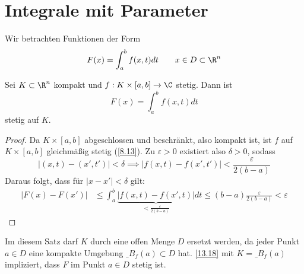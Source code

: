 \documentclass{mycourse}
\begin{document}
\section{Integrale mit Parameter}

Wir betrachten Funktionen der Form
\[
F(x) = \int_a^bf(x,t)dt \qquad x\in D\subset \R^n
\]

\begin{st}
\label{13.18}
Sei $K\subset \R^n$ kompakt und $f:K\times [a,b]\to \C$ stetig.
Dann ist
\[
F(x) = \int_a^bf(x,t)dt
\]
stetig auf $K$.

\begin{proof}
Da $K\times[a,b]$ abgeschlossen und beschränkt, also kompakt ist, ist $f$ auf $K\times [a,b]$ gleichmäßig stetig (\ref{8.13}).
Zu $\varepsilon>0$ existiert also $\delta>0$, sodass
\[
|(x,t)-(x',t')| < \delta \implies |f(x,t)-f(x',t')| < \frac \varepsilon {2(b-a)}
\]
Daraus folgt, dass für $|x-x'| < \delta$ gilt:
\begin{align*}
|F(x)-F(x')| &\le \int_a^b\underbrace{|f(x,t)-f(x',t)|}_{< \frac \varepsilon{2(b-a)}} dt
\le (b-a)\frac \varepsilon{2(b-a)} < \varepsilon
\end{align*}
\end{proof}

\begin{note}
Im diesem Satz darf $K$ durch eine offen Menge $D$ ersetzt werden, da jeder Punkt $a\in D$ eine kompakte Umgebung $\_{B_f(a)}\subset D$ hat.
\ref{13.18} mit $K=\_{B_f(a)}$ impliziert, dass $F$ im Punkt $a\in D$ stetig ist. 
\end{note}
\end{st}
\end{document}
